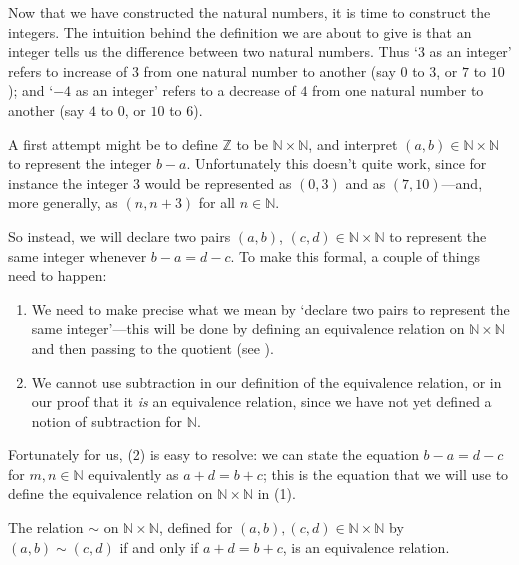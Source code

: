 Now that we have constructed the natural numbers, it is time to construct the integers. The intuition behind the definition we are about to give is that an integer tells us the difference between two natural numbers. Thus `$3$ as an integer' refers to increase of $3$ from one natural number to another (say $0$ to $3$, or $7$ to $10$); and `$-4$ as an integer' refers to a decrease of $4$ from one natural number to another (say $4$ to $0$, or $10$ to $6$).

A first attempt might be to define $\mathbb{Z}$ to be $\mathbb{N} \times \mathbb{N}$, and interpret $(a,b) \in \mathbb{N} \times \mathbb{N}$ to represent the integer $b-a$. Unfortunately this doesn't quite work, since for instance the integer $3$ would be represented as $(0,3)$ and as $(7,10)$---and, more generally, as $(n,n+3)$ for all $n \in \mathbb{N}$.

So instead, we will declare two pairs $(a,b)$, $(c,d) \in \mathbb{N} \times \mathbb{N}$ to represent the same integer whenever $b-a = d-c$. To make this formal, a couple of things need to happen:
\begin{enumerate}[(1)]
\item We need to make precise what we mean by `declare two pairs to represent the same integer'---this will be done by defining an equivalence relation on $\mathbb{N} \times \mathbb{N}$ and then passing to the quotient (see ).
\item We cannot use subtraction in our definition of the equivalence relation, or in our proof that it \textit{is} an equivalence relation, since we have not yet defined a notion of subtraction for $\mathbb{N}$.
\end{enumerate}

Fortunately for us, (2) is easy to resolve: we can state the equation $b-a = d-c$ for $m,n \in \mathbb{N}$ equivalently as $a+d = b+c$; this is the equation that we will use to define the equivalence relation on $\mathbb{N} \times \mathbb{N}$ in (1).

\begin{lemma}
\label{lemEquivalenceRelationToConstructZFromN}
The relation $\sim$ on $\mathbb{N} \times \mathbb{N}$, defined for $(a,b), (c,d) \in \mathbb{N} \times \mathbb{N}$ by $(a,b) \sim (c,d)$ if and only if $a+d=b+c$, is an equivalence relation.
\end{lemma}

